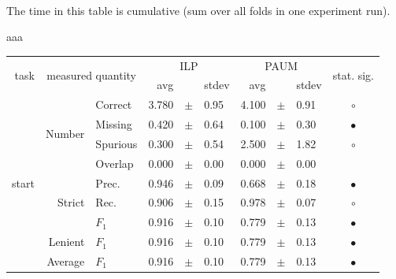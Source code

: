 \begin{table}
\begin{tabular}
\\
\end{tabular}

\medskip
The time in this table is cumulative (sum over all folds in one experiment run).

\caption{Time spent by ML engines on the Czech Fireman dataset.} \label{tab:ch60_fir_time}
\end{table}







\clearpage
aaa

\vspace{1.1cm}


\begin{longtable}{|r|r|l||rcl|rcl|c|}
\hline
\multirow{2}{*}{task} & \multicolumn{2}{|c||}{\multirow{2}{*}{measured quantity}} & \multicolumn{3}{|c|}{ILP} & \multicolumn{3}{|c|}{PAUM} & \multirow{2}{*}{ stat. sig.}\\
\cline{4-9}
  & \multicolumn{2}{|c||}{} &  avg  &    &  stdev  &  avg  &    &  stdev  & \\
\hline
\endhead
\hline
\hline
\multirow{11}{*}{\begin{sideways}start\end{sideways} } & \multirow{4}{*}{Number} &  Correct  & 3.780 &  $\pm$  & 0.95 & 4.100 &  $\pm$  & 0.91 &  $\circ$\\
\cline{3-10}
 &  &  Missing  & 0.420 &  $\pm$  & 0.64 & 0.100 &  $\pm$  & 0.30 &  $\bullet$\\
\cline{3-10}
 &  &  Spurious  & 0.300 &  $\pm$  & 0.54 & 2.500 &  $\pm$  & 1.82 &  $\circ$\\
\cline{3-10}
 &  &  Overlap  & 0.000 &  $\pm$  & 0.00 & 0.000 &  $\pm$  & 0.00 &   \\
\cline{2-10}
 & \multirow{3}{*}{Strict} &  Prec.  & 0.946 &  $\pm$  & 0.09 & 0.668 &  $\pm$  & 0.18 &  $\bullet$\\
\cline{3-10}
 &  &  Rec.  & 0.906 &  $\pm$  & 0.15 & 0.978 &  $\pm$  & 0.07 &  $\circ$\\
\cline{3-10}
 &  &  $F_1$  & 0.916 &  $\pm$  & 0.10 & 0.779 &  $\pm$  & 0.13 &  $\bullet$\\
\cline{2-10}
 & Lenient &  $F_1$  & 0.916 &  $\pm$  & 0.10 & 0.779 &  $\pm$  & 0.13 &  $\bullet$\\
\cline{2-10}
 & Average &  $F_1$  & 0.916 &  $\pm$  & 0.10 & 0.779 &  $\pm$  & 0.13 &  $\bullet$\\

\end{longtable}
